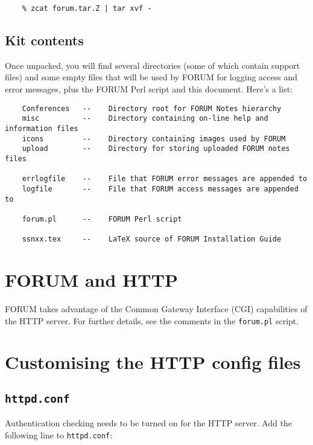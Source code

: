 \documentclass[11pt]{article}
\begin{document}
\begin{verbatim}
    % zcat forum.tar.Z | tar xvf -
\end{verbatim}

\subsection{Kit contents}

Once unpacked, you will find several directories (some of which
contain support files) and some empty files that will be used by FORUM 
for logging access and error messages, plus the FORUM Perl script and this
document. Here's a list:

\begin{verbatim}
    Conferences   --    Directory root for FORUM Notes hierarchy
    misc          --    Directory containing on-line help and information files
    icons         --    Directory containing images used by FORUM
    upload        --    Directory for storing uploaded FORUM notes files

    errlogfile    --    File that FORUM error messages are appended to
    logfile       --    File that FORUM access messages are appended to

    forum.pl      --    FORUM Perl script

    ssnxx.tex     --    LaTeX source of FORUM Installation Guide
\end{verbatim}



\section{FORUM and HTTP}

FORUM takes advantage of the Common Gateway Interface (CGI) capabilities of the 
HTTP server. For further details, see the comments in the {\tt forum.pl}
script.

\section{Customising the HTTP config files}

\subsection{{\tt httpd.conf}}

Authentication checking needs to be turned on for the HTTP server. Add the
following line to {\tt httpd.conf}:
\end{document}

